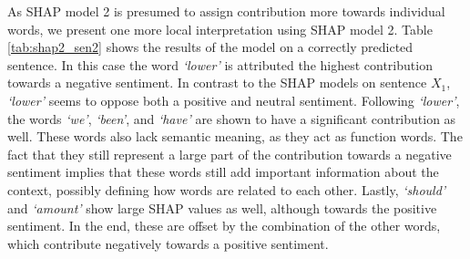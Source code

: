 \vspace{\baselineskip}
As SHAP model 2 is presumed to assign contribution more towards individual words, we present one more local interpretation using SHAP model 2. Table \ref{tab:shap2_sen2} shows the results of the model on a correctly predicted sentence. In this case the word \textit{`lower'} is attributed the highest contribution towards a negative sentiment. In contrast to the SHAP models on sentence $X_1$, \textit{`lower'} seems to oppose both a positive and neutral sentiment. Following \textit{`lower'}, the words \textit{`we'}, \textit{`been'}, and \textit{`have'} are shown to have a significant contribution as well. These words also lack semantic meaning, as they act as function words. The fact that they still represent a large part of the contribution towards a negative sentiment implies that these words still add important information about the context, possibly defining how words are related to each other.
Lastly, \textit{`should'} and \textit{`amount'} show large SHAP values as well, although towards the positive sentiment. In the end, these are offset by the combination of the other words, which contribute negatively towards a positive sentiment. 


